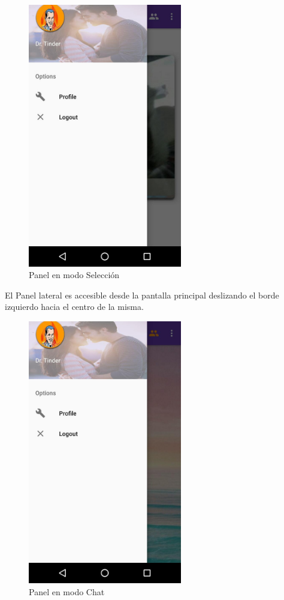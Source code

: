 \documentclass[10pt,letterpaper,extrafontsizes]{memoir}
\begin{document}
\begin{figure}[H]
    \centering
\includegraphics[width=0.6\textwidth]{graficos/capturas/t}
    \caption{Panel en modo Selección}
    \label{fig:panel1}
\end{figure}

El Panel lateral es accesible desde la pantalla principal deslizando el borde izquierdo hacia el centro de la misma.

\begin{figure}[H]
    \centering
\includegraphics[width=0.6\textwidth]{graficos/capturas/s}
    \caption{Panel en modo Chat}
    \label{fig:panle2}
\end{figure}
\end{document}
